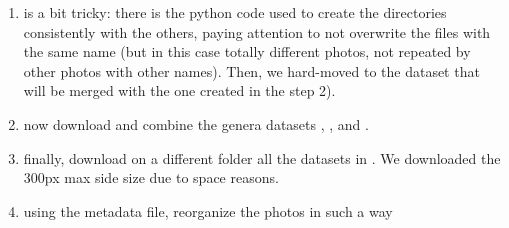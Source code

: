 \documentclass[conference]{IEEEtran}
\begin{document}
\begin{enumerate}
	\item \cite{kaggle_multiinput_mushroom} is a bit tricky: there is the python code used to create the directories consistently with the others, paying attention to not overwrite the files with the same name (but in this case totally different photos, not repeated by other photos with other names). Then, we hard-moved to the dataset that will be merged with the one created in the step 2).
	
	\item now download and combine the genera datasets \cite{kaggle_mushroom_common_genus}, \cite{kaggle_mushroom_classification_lizhecheng}, \cite{kaggle_deepmushroom} and \cite{kaggle_mushroom_gcarbondioxide}.
	
	\item finally, download on a different folder all the datasets in \cite{danish_fungi_dataset}. We downloaded the 300px max side size due to space reasons.
	
	\item using the metadata file, reorganize the photos in such a way  
\end{enumerate}
\end{document}
